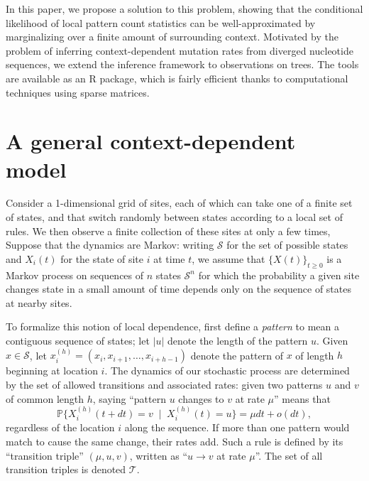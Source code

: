 \documentclass{article}
\renewcommand{\P}{\mathbb{P}}
\newcommand{\calS}{\mathcal{S}}  %
\newcommand{\calT}{\mathcal{T}}  %
\newcommand{\given}{\;\mid\;}
\theoremstyle{plain}
\theoremstyle{definition}
\begin{document}
In this paper, we propose a solution to this problem,
showing that the conditional likelihood of local pattern count statistics
can be well-approximated by marginalizing over a finite amount of surrounding context.
Motivated by the problem of inferring context-dependent mutation rates from diverged nucleotide sequences,
we extend the inference framework to observations on trees.
The tools are available as an R package,
which is fairly efficient thanks to
computational techniques using sparse matrices.



\section{A general context-dependent model}

Consider a 1-dimensional grid of sites, each of which can take one of a finite set of states,
and that switch randomly between states according to a local set of rules.
We then observe a finite collection of these sites at only a few times,
Suppose that the dynamics are Markov:
writing $\calS$ for the set of possible states
and $X_i(t)$ for the state of site $i$ at time $t$,
we assume that $\{X(t)\}_{t \ge 0}$ is a Markov process on sequences of $n$ states $\calS^n$
for which the probability a given site changes state in a small amount of time
depends only on the sequence of states at nearby sites.

To formalize this notion of local dependence,
first define a \textit{pattern} to mean a contiguous sequence of states;
let $|u|$ denote the length of the pattern $u$.
Given $x \in \calS$,
let $x_i^{(h)} = (x_i, x_{i+1}, \ldots, x_{i+h-1})$ denote the pattern of $x$ of length $h$ beginning at location $i$.
The dynamics of our stochastic process are determined by the set of allowed transitions and associated rates:
given two patterns $u$ and $v$ of common length $h$,
saying ``pattern $u$ changes to $v$ at rate $\mu$'' means that
\[
    \P\{ X_i^{(h)}(t+dt) = v \given X_i^{(h)}(t) = u \} = \mu dt + o(dt),
\]
regardless of the location $i$ along the sequence.
If more than one pattern would match to cause the same change, their rates add.
Such a rule is defined by its ``transition triple'' $(\mu,u,v)$,
written as ``$u \to v$ at rate $\mu$''.
The set of all transition triples is denoted $\calT$.
\end{document}
